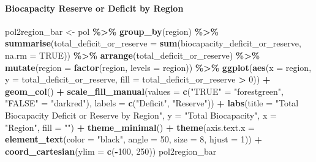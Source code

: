 \documentclass[
]{article}
\newenvironment{Shaded}{\begin{snugshade}}{\end{snugshade}}
\newcommand{\AttributeTok}[1]{\textcolor[rgb]{0.13,0.29,0.53}{#1}}
\newcommand{\ConstantTok}[1]{\textcolor[rgb]{0.56,0.35,0.01}{#1}}
\newcommand{\DecValTok}[1]{\textcolor[rgb]{0.00,0.00,0.81}{#1}}
\newcommand{\FunctionTok}[1]{\textcolor[rgb]{0.13,0.29,0.53}{\textbf{#1}}}
\newcommand{\NormalTok}[1]{#1}
\newcommand{\OtherTok}[1]{\textcolor[rgb]{0.56,0.35,0.01}{#1}}
\newcommand{\SpecialCharTok}[1]{\textcolor[rgb]{0.81,0.36,0.00}{\textbf{#1}}}
\newcommand{\StringTok}[1]{\textcolor[rgb]{0.31,0.60,0.02}{#1}}
\begin{document}
\paragraph{Biocapacity Reserve or Deficit by
Region}\label{biocapacity-reserve-or-deficit-by-region}

\begin{Shaded}
\begin{Highlighting}[]
\NormalTok{pol2region\_bar }\OtherTok{\textless{}{-}}\NormalTok{ pol }\SpecialCharTok{\%\textgreater{}\%}
  \FunctionTok{group\_by}\NormalTok{(region) }\SpecialCharTok{\%\textgreater{}\%}
  \FunctionTok{summarise}\NormalTok{(}\AttributeTok{total\_deficit\_or\_reserve =} \FunctionTok{sum}\NormalTok{(biocapacity\_deficit\_or\_reserve, }\AttributeTok{na.rm =} \ConstantTok{TRUE}\NormalTok{)) }\SpecialCharTok{\%\textgreater{}\%}
  \FunctionTok{arrange}\NormalTok{(total\_deficit\_or\_reserve) }\SpecialCharTok{\%\textgreater{}\%}
  \FunctionTok{mutate}\NormalTok{(}\AttributeTok{region =} \FunctionTok{factor}\NormalTok{(region, }\AttributeTok{levels =}\NormalTok{ region)) }\SpecialCharTok{\%\textgreater{}\%}
  \FunctionTok{ggplot}\NormalTok{(}\FunctionTok{aes}\NormalTok{(}\AttributeTok{x =}\NormalTok{ region, }\AttributeTok{y =}\NormalTok{ total\_deficit\_or\_reserve, }\AttributeTok{fill =}\NormalTok{ total\_deficit\_or\_reserve }\SpecialCharTok{\textgreater{}} \DecValTok{0}\NormalTok{)) }\SpecialCharTok{+}
  \FunctionTok{geom\_col}\NormalTok{() }\SpecialCharTok{+}
  \FunctionTok{scale\_fill\_manual}\NormalTok{(}\AttributeTok{values =} \FunctionTok{c}\NormalTok{(}\StringTok{"TRUE"} \OtherTok{=} \StringTok{"forestgreen"}\NormalTok{, }\StringTok{"FALSE"} \OtherTok{=} \StringTok{"darkred"}\NormalTok{),}
                    \AttributeTok{labels =} \FunctionTok{c}\NormalTok{(}\StringTok{"Deficit"}\NormalTok{, }\StringTok{"Reserve"}\NormalTok{)) }\SpecialCharTok{+}
  \FunctionTok{labs}\NormalTok{(}\AttributeTok{title =} \StringTok{"Total Biocapacity Deficit or Reserve by Region"}\NormalTok{,}
       \AttributeTok{y =} \StringTok{"Total Biocapacity"}\NormalTok{,}
       \AttributeTok{x =} \StringTok{"Region"}\NormalTok{,}
       \AttributeTok{fill =} \StringTok{""}\NormalTok{) }\SpecialCharTok{+}
  \FunctionTok{theme\_minimal}\NormalTok{() }\SpecialCharTok{+}
  \FunctionTok{theme}\NormalTok{(}\AttributeTok{axis.text.x =} \FunctionTok{element\_text}\NormalTok{(}\AttributeTok{color =} \StringTok{"black"}\NormalTok{, }\AttributeTok{angle =} \DecValTok{50}\NormalTok{, }\AttributeTok{size =} \DecValTok{8}\NormalTok{, }\AttributeTok{hjust =} \DecValTok{1}\NormalTok{)) }\SpecialCharTok{+}
  \FunctionTok{coord\_cartesian}\NormalTok{(}\AttributeTok{ylim =} \FunctionTok{c}\NormalTok{(}\SpecialCharTok{{-}}\DecValTok{100}\NormalTok{, }\DecValTok{250}\NormalTok{))}
\NormalTok{pol2region\_bar}
\end{Highlighting}
\end{Shaded}
\end{document}
